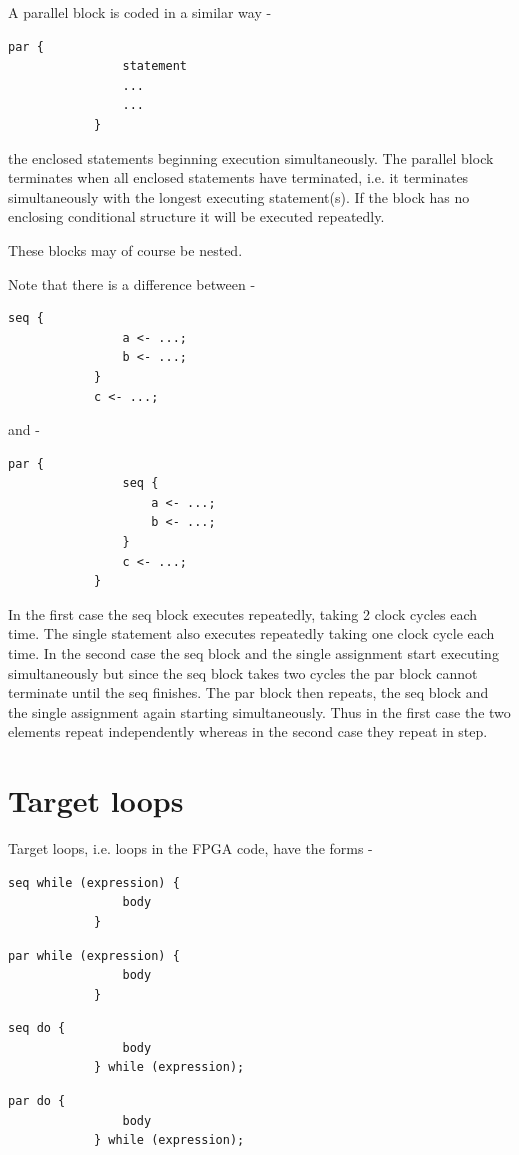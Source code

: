         A parallel block is coded in a similar way -
        \begin{lstlisting}[language=threepl]
            par {
                statement
                ...
                ...
            }
        \end{lstlisting}
        the enclosed statements beginning execution simultaneously.
        The parallel block terminates when all enclosed statements have terminated, i.e.
        it terminates simultaneously with the longest executing statement(s).
        If the  block
        has no enclosing conditional structure it will be executed repeatedly.    

        These blocks may of course be nested.

        Note that there is a difference between -
        \begin{lstlisting}[language=threepl]
            seq {
                a <- ...;
                b <- ...;
            }
            c <- ...;
        \end{lstlisting}
        and -
        \begin{lstlisting}[language=threepl]
            par {
                seq {
                    a <- ...;
                    b <- ...;
                }
                c <- ...;
            }
        \end{lstlisting}
        In the first case the seq block executes repeatedly, taking 2 clock
        cycles each time. The single statement also executes repeatedly taking
        one clock cycle each time. In the second case the seq block and the
        single assignment start executing simultaneously but since the seq block
        takes two cycles the par block cannot terminate until the seq finishes.
        The par block then repeats, the seq block and the single assignment
        again starting simultaneously. Thus in the first case the two elements
        repeat independently whereas in the second case they repeat in step.

    \section{Target loops}

        Target loops, i.e. loops in the FPGA code, have the forms -
        \begin{lstlisting}[language=threepl]
            seq while (expression) {
                body
            }
        \end{lstlisting}
        \begin{lstlisting}[language=threepl]
            par while (expression) {
                body
            }
        \end{lstlisting}
        \begin{lstlisting}[language=threepl]
            seq do {
                body
            } while (expression);
        \end{lstlisting}
        \begin{lstlisting}[language=threepl]
            par do {
                body
            } while (expression);
        \end{lstlisting}


